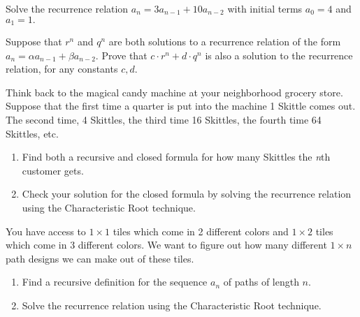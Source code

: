 \documentclass[11pt,]{book}
\theoremstyle{ptxplainnotitle}
\theoremstyle{ptxplaintitle}
\theoremstyle{ptxdefinitionnotitle}
\theoremstyle{ptxdefinitiontitle}
\theoremstyle{ptxdefinitionnotitle}
\theoremstyle{ptxdefinitiontitle}
\theoremstyle{ptxdefinitionnotitle}
\theoremstyle{ptxdefinitiontitle}
\theoremstyle{ptxdefinitiontitlenonumber}
\theoremstyle{ptxdefinitiontitlenonumber}
\numberwithin{equation}{chapter}
\begin{document}
\begin{divisionexercise}{7}\hypertarget{exercise-48}{}
\hypertarget{p-520}{}%
Solve the recurrence relation \(a_n = 3a_{n-1} + 10a_{n-2}\) with initial terms \(a_0 = 4\) and \(a_1 = 1\text{.}\)%
\end{divisionexercise}%
\begin{divisionexercise}{8}\hypertarget{exercise-49}{}
\hypertarget{p-523}{}%
Suppose that \(r^n\) and \(q^n\) are both solutions to a recurrence relation of the form \(a_n = \alpha a_{n-1} + \beta a_{n-2}\).  Prove that \(c\cdot r^n + d \cdot q^n\) is also a solution to the recurrence relation, for any constants \(c, d\).%
\end{divisionexercise}%
\begin{divisionexercise}{9}\hypertarget{exercise-50}{}
\hypertarget{p-524}{}%
Think back to the magical candy machine at your neighborhood grocery store. Suppose that the first time a quarter is put into the machine 1 Skittle comes out. The second time, 4 Skittles, the third time 16 Skittles, the fourth time 64 Skittles, etc. \leavevmode%
\begin{enumerate}[label=(\alph*)]
\item\hypertarget{li-237}{}\hypertarget{p-525}{}%
Find both a recursive and closed formula for how many Skittles the \emph{n}th customer gets.%
\item\hypertarget{li-238}{}\hypertarget{p-526}{}%
Check your solution for the closed formula by solving the recurrence relation using the Characteristic Root technique.%
\end{enumerate}
%
\end{divisionexercise}%
\begin{divisionexercise}{10}\hypertarget{exercise-51}{}
\hypertarget{p-527}{}%
You have access to \(1 \times 1\) tiles which come in 2 different colors and \(1\times 2\) tiles which come in 3 different colors. We want to figure out how many different \(1 \times n\) path designs we can make out of these tiles.%
\leavevmode%
\begin{enumerate}[label=(\alph*)]
\item\hypertarget{li-239}{}\hypertarget{p-528}{}%
Find a recursive definition for the sequence \(a_n\) of paths of length \(n\).%
\item\hypertarget{li-240}{}\hypertarget{p-529}{}%
Solve the recurrence relation using the Characteristic Root technique.%
\end{enumerate}
\end{divisionexercise}%
\end{document}

